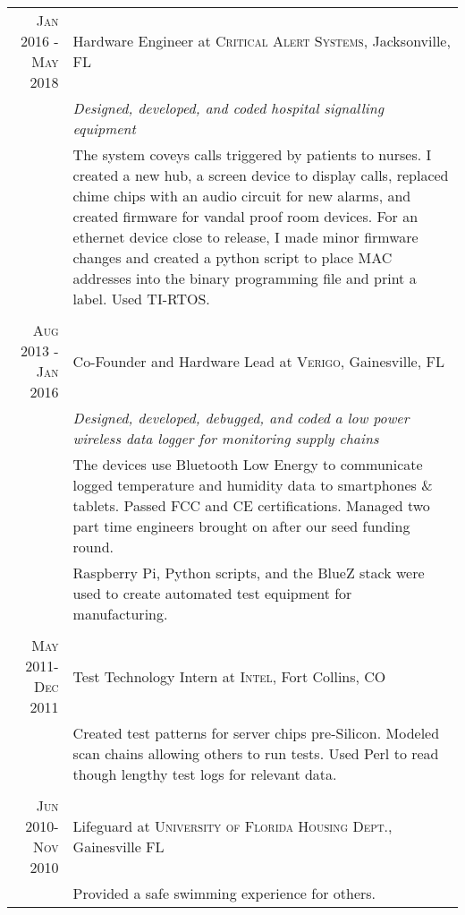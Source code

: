 \documentclass[a4paper,10pt]{article} %
\begin{document}
\begin{tabular}{r|p{11cm}}


\textsc{Jan 2016 - May 2018} &  Hardware Engineer at \textsc{Critical Alert Systems}, Jacksonville, FL \\
& \emph{Designed, developed, and coded hospital signalling equipment}\\
&\footnotesize{The system coveys calls triggered by patients to nurses. I created a new hub, a screen device to display calls, replaced chime chips with an audio circuit for new alarms, and created firmware for vandal proof room devices. For an ethernet device close to release, I made minor firmware changes and created a python script to place MAC addresses into the binary programming file and print a label. Used TI-RTOS.}\\
\multicolumn{2}{c}{} \\

\textsc{Aug 2013 - Jan 2016} &  Co-Founder and Hardware Lead at \textsc{Verigo}, Gainesville, FL \\
& \emph{Designed, developed, debugged, and coded a low power wireless data logger for monitoring supply chains}\\
&\footnotesize{The devices use Bluetooth Low Energy to communicate logged temperature and humidity data to smartphones \& tablets. Passed FCC and CE certifications. Managed two part time engineers brought on after our seed funding round. }\\
&\footnotesize{Raspberry Pi, Python scripts, and the BlueZ stack were used to create automated test equipment for manufacturing.}\\
\multicolumn{2}{c}{} \\


\textsc{May 2011-Dec 2011} & Test Technology Intern at \textsc{Intel}, Fort Collins, CO \emph{}\\
& \footnotesize{Created test patterns for server chips pre-Silicon. Modeled scan chains allowing others to run tests. Used Perl to read though lengthy test logs for relevant data.}\\
\multicolumn{2}{c}{} \\


\textsc{Jun 2010-Nov 2010} & Lifeguard at \textsc{University of Florida Housing Dept.}, Gainesville FL \emph{}\\
& \footnotesize{Provided a safe swimming experience for others.}\\
\end{tabular}
\end{document}
